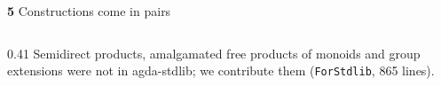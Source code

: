 \begin{frame}{\textbf{5}\; Constructions come in pairs}
\begin{columns}[c]
\begin{column}{0.41\textwidth}
{\scriptsize Semidirect products, amalgamated free products of monoids and group
extensions were not in agda-stdlib; we contribute them (\texttt{ForStdlib}, 865 lines).}
\end{column}
\end{columns}
\end{frame}
